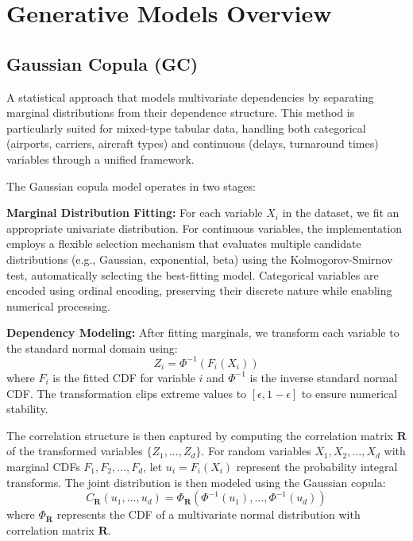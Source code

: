 \documentclass[conference]{IEEEtran}
\begin{document}
\appendices
\section{Generative Models Overview}
\label{sec:appendix-generative_models}


\subsection{Gaussian Copula (GC)}
A statistical approach that models multivariate dependencies by separating marginal distributions from their dependence structure. This method is particularly suited for mixed-type tabular data, handling both categorical (airports, carriers, aircraft types) and continuous (delays, turnaround times) variables through a unified framework.

The Gaussian copula model operates in two stages:

\textbf{Marginal Distribution Fitting:} For each variable $X_i$ in the dataset, we fit an appropriate univariate distribution. For continuous variables, the implementation employs a flexible selection mechanism that evaluates multiple candidate distributions (e.g., Gaussian, exponential, beta) using the Kolmogorov-Smirnov test, automatically selecting the best-fitting model. Categorical variables are encoded using ordinal encoding, preserving their discrete nature while enabling numerical processing.

\textbf{Dependency Modeling:} After fitting marginals, we transform each variable to the standard normal domain using:
\begin{equation}
Z_i = \Phi^{-1}(F_i(X_i))
\end{equation}
where $F_i$ is the fitted CDF for variable $i$ and $\Phi^{-1}$ is the inverse standard normal CDF. The transformation clips extreme values to $[\epsilon, 1-\epsilon]$ to ensure numerical stability.

The correlation structure is then captured by computing the correlation matrix $\mathbf{R}$ of the transformed variables $\{Z_1, ..., Z_d\}$. For random variables $X_1, X_2, \ldots, X_d$ with marginal CDFs $F_1, F_2, \ldots, F_d$, let $u_i = F_i(X_i)$ represent the probability integral transforms. The joint distribution is then modeled using the Gaussian copula:
\begin{equation}
C_{\mathbf{R}}(u_1, ..., u_d) = \Phi_{\mathbf{R}}(\Phi^{-1}(u_1), ..., \Phi^{-1}(u_d))
\end{equation}
where $\Phi_{\mathbf{R}}$ represents the CDF of a multivariate normal distribution with correlation matrix $\mathbf{R}$.
\end{document}
